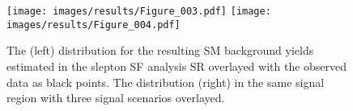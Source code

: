 \begin{figure}[ht!]
\centering
\texttt{[image: images/results/Figure\_003.pdf]}
\texttt{[image: images/results/Figure\_004.pdf]}
\caption{The \ptmiss (left) distribution for the resulting SM background yields estimated in the slepton SF analysis SR overlayed with the observed data as black points.
The \mttwo distribution (right) in the same signal region with three signal scenarios overlayed.}
\label{fig:results}
\end{figure}

